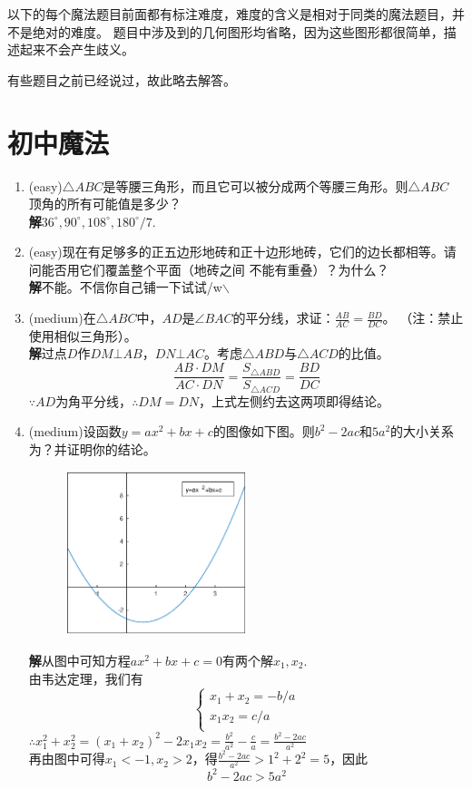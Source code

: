 \documentclass[a4paper]{article}
\begin{document}
以下的每个魔法题目前面都有标注难度，难度的含义是相对于同类的魔法题目，并不是绝对的难度。
题目中涉及到的几何图形均省略，因为这些图形都很简单，描述起来不会产生歧义。

有些题目之前已经说过，故此略去解答。

\section{初中魔法}
\begin{enumerate}
\item (easy)$\triangle ABC$是等腰三角形，而且它可以被分成两个等腰三角形。则$\triangle ABC$
顶角的所有可能值是多少？\\
\textbf{解}\quad $36^\circ,90^\circ,108^\circ,180^\circ/7$.
\item (easy)现在有足够多的正五边形地砖和正十边形地砖，它们的边长都相等。请问能否用它们覆盖整个平面（地砖之间
不能有重叠）？为什么？\\
\textbf{解}\quad 不能。不信你自己铺一下试试/w$\backslash$
\item (medium)在$\triangle ABC$中，$AD$是$\angle BAC$的平分线，求证：$\frac{AB}{AC}=\frac{BD}{DC}$。
（注：禁止使用相似三角形）。\\
\textbf{解}\quad 过点$D$作$DM\bot AB$，$DN\bot AC$。考虑$\triangle ABD$与$\triangle ACD$的比值。\\
\[
\frac{AB\cdot DM}{AC\cdot DN}=\frac{S_{\triangle ABD}}{S_{\triangle ACD}}=\frac{BD}{DC}
\]
$\because AD$为角平分线，$\therefore DM=DN$，上式左侧约去这两项即得结论。
\item (medium)设函数$y=ax^2+bx+c$的图像如下图。则$b^2-2ac$和$5a^2$的大小关系为？并证明你的结论。\\
\begin{figure}[!hbp]
\centering
\includegraphics[width=0.5\textwidth]{quad.eps}
\end{figure}
\textbf{解}\quad 从图中可知方程$ax^2+bx+c=0$有两个解$x_1,x_2$.\\
由韦达定理，我们有
\[
\left\{\begin{array}{l}
x_1+x_2=-b/a\\
x_1x_2=c/a\\
\end{array}
\right.
\]
$\therefore x_1^2+x_2^2=(x_1+x_2)^2-2x_1x_2=\frac{b^2}{a^2}-\frac{c}{a}=\frac{b^2-2ac}{a^2}$\\
再由图中可得$x_1<-1,x_2>2$，得$\frac{b^2-2ac}{a^2} > 1^2+2^2=5$，因此
\[
b^2-2ac>5a^2
\]


\end{enumerate}
\end{document}
